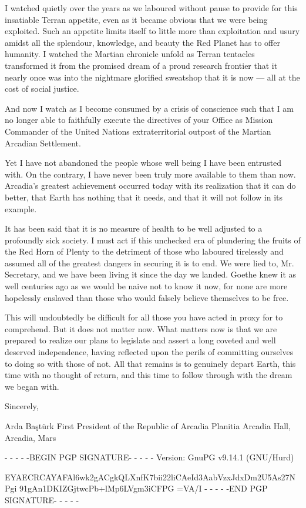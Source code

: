 I watched quietly over the years as we laboured without pause to provide for this insatiable Terran appetite, even as it became obvious that we were being exploited. Such an appetite limits itself to little more than exploitation and usury amidst all the splendour, knowledge, and beauty the Red Planet has to offer humanity. I watched the Martian chronicle unfold as Terran tentacles transformed it from the promised dream of a proud research frontier that it nearly once was into the nightmare glorified sweatshop that it is now — all at the cost of social justice.

And now I watch as I become consumed by a crisis of conscience such that I am no longer able to faithfully execute the directives of your Office as Mission Commander of the United Nations extraterritorial outpost of the Martian Arcadian Settlement.

Yet I have not abandoned the people whose well being I have been entrusted with. On the contrary, I have never been truly more available to them than now. Arcadia's greatest achievement occurred today with its realization that it can do better, that Earth has nothing that it needs, and that it will not follow in its example. 

It has been said that it is no measure of health to be well adjusted to a profoundly sick society. I must act if this unchecked era of plundering the fruits of the Red Horn of Plenty to the detriment of those who laboured tirelessly and assumed all of the greatest dangers in securing it is to end. We were lied to, Mr. Secretary, and we have been living it since the day we landed. Goethe knew it as well centuries ago as we would be naive not to know it now, for none are more hopelessly enslaved than those who would falsely believe themselves to be free.

This will undoubtedly be difficult for all those you have acted in proxy for to comprehend. But it does not matter now. What matters now is that we are prepared to realize our plans to legislate and assert a long coveted and well deserved independence, having reflected upon the perils of committing ourselves to doing so with those of not. All that remains is to genuinely depart Earth, this time with no thought of return, and this time to follow through with the dream we began with.

Sincerely, 

\hskip 1.5cm 
   
Arda Baştürk
First President of the Republic of Arcadia Planitia
Arcadia Hall, Arcadia, Mars

- - - - -BEGIN PGP SIGNATURE- - - - -
Version: GnuPG v9.14.1 (GNU/Hurd)

EYAECRCAYAFAl6wk2gACgkQLXnfK7bii22liCAeId3AabVzxJdxDm2U5As27NPgi
91gAn1DKIZGjtwcPb+lMp6LVgm3iCFPG
=VA/I
- - - - -END PGP SIGNATURE- - - - -
\stoplines

